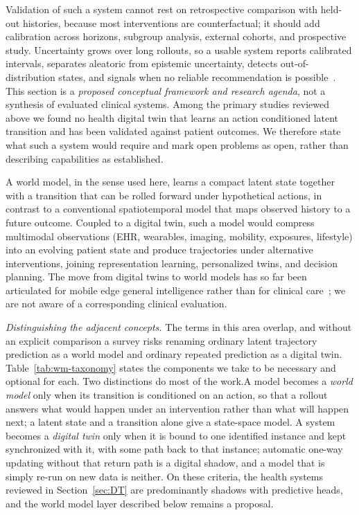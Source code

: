 \documentclass[journal]{IEEEtran}
\newif\ifsubmission
\begin{document}
Validation of such a system cannot rest on retrospective comparison with held-out histories, because most interventions are counterfactual; it should add calibration across horizons, subgroup analysis, external cohorts, and prospective study. Uncertainty grows over long rollouts, so a usable system reports calibrated intervals, separates aleatoric from epistemic uncertainty, detects out-of-distribution states, and signals when no reliable recommendation is possible~\cite{Sel2025VVUQ}.
\else
This section is a \emph{proposed conceptual framework and research agenda}, not a synthesis of evaluated clinical systems. Among the primary studies reviewed above we found no health digital twin that learns an action conditioned latent transition and has been validated against patient outcomes. We therefore state what such a system would require and mark open problems as open, rather than describing capabilities as established.

A world model, in the sense used here, learns a compact latent state together with a transition that can be rolled forward under hypothetical actions, in contrast to a conventional spatiotemporal model that maps observed history to a future outcome. Coupled to a digital twin, such a model would compress multimodal observations (EHR, wearables, imaging, mobility, exposures, lifestyle) into an evolving patient state and produce trajectories under alternative interventions, joining representation learning, personalized twins, and decision planning. The move from digital twins to world models has so far been articulated for mobile edge general intelligence rather than for clinical care~\cite{Zheng2026DTtoWM}; we are not aware of a corresponding clinical evaluation.

\emph{Distinguishing the adjacent concepts.} The terms in this area overlap, and without an explicit comparison a survey risks renaming ordinary latent trajectory prediction as a world model and ordinary repeated prediction as a digital twin. \ifsubmission Two criteria do most of the work.\else Table~\ref{tab:wm-taxonomy} states the components we take to be necessary and optional for each. Two distinctions do most of the work.\fi A model becomes a \emph{world model} only when its transition is conditioned on an action, so that a rollout answers what would happen under an intervention rather than what will happen next; a latent state and a transition alone give a state-space model. A system becomes a \emph{digital twin} only when it is bound to one identified instance and kept synchronized with it, with some path back to that instance; automatic one-way updating without that return path is a digital shadow, and a model that is simply re-run on new data is neither. On these criteria, the health systems reviewed in Section~\ref{sec:DT} are predominantly shadows with predictive heads, and the world model layer described below remains a proposal.
\end{document}

